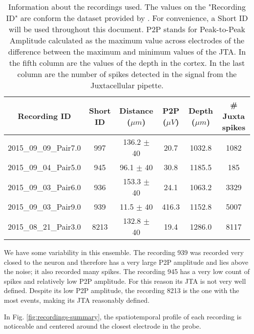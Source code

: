 \begin{table}[!h]
\centering
\begin{tabular}{cccccc}
\textbf{Recording ID} & \textbf{Short ID} & \textbf{Distance ($\mu m$) } & \textbf{P2P ($\mu V$)} & \textbf{Depth ($\mu m$)} & \textbf{\# Juxta spikes}\\ \hline
2015\_09\_09\_Pair7.0 & 997 & 136.2 $\pm$ 40 & 20.7 & 1032.8 & 1082  \\ 
2015\_09\_04\_Pair5.0 & 945 & 96.1 $\pm$ 40 & 30.8 & 1185.5 & 185  \\
2015\_09\_03\_Pair6.0 & 936 & 153.3 $\pm$  40 & 24.1 & 1063.2 & 3329 \\
2015\_09\_03\_Pair9.0 & 939 & 11.5 $\pm$  40 & 416.3 & 1152.8 & 5007  \\
2015\_08\_21\_Pair3.0 & 8213 & 132.8 $\pm$ 40 & 19.4 & 1286.0 & 8117 \\ 
\end{tabular}
\caption{Information about the recordings used. The values on the "Recording ID" are conform the dataset provided by \cite{Netoetal}. For convenience, a Short ID will be used throughout this document. P2P stands for Peak-to-Peak Amplitude calculated as the maximum value across electrodes of the difference between the maximum and minimum values of the JTA. In the fifth column are the values of the depth in the cortex. In the last column are the number of spikes detected in the signal from the Juxtacellular pipette.}
\label{tab:sum-recordings}
\end{table}
We have some variability in this ensemble. 
The recording 939 was recorded very closed to the neuron and therefore has a very large P2P amplitude and lies above the noise; it also recorded many spikes. 
The recording 945 has a very low count of spikes and relatively low P2P amplitude. For this reason its JTA is not very well defined.
Despite its low P2P amplitude, the recording 8213 is the one with the most events, making its JTA reasonably defined.

In Fig. \ref{fig:recordings-summary}, the spatiotemporal profile of each recording is noticeable and centered around the closest electrode in the probe.

